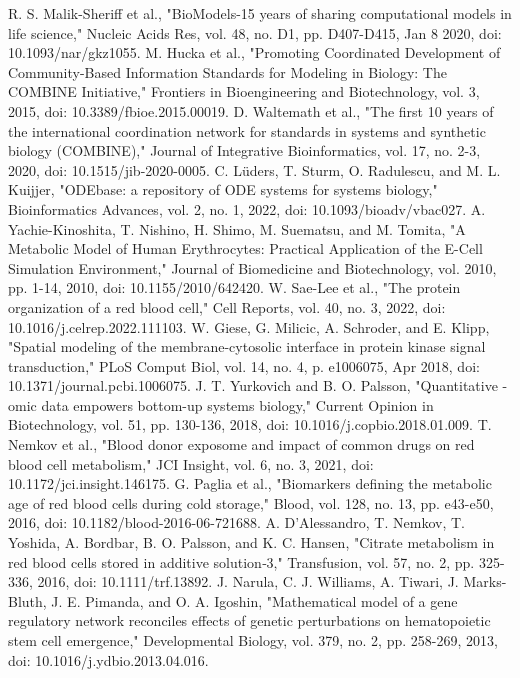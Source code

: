 \documentclass[conference]{IEEEtran}
\begin{document}
\begin{thebibliography}{00}
 R. S. Malik-Sheriff et al., "BioModels-15 years of sharing computational models in life science," Nucleic Acids Res, vol. 48, no. D1, pp. D407-D415, Jan 8 2020, doi: 10.1093/nar/gkz1055.
 M. Hucka et al., "Promoting Coordinated Development of Community-Based Information Standards for Modeling in Biology: The COMBINE Initiative," Frontiers in Bioengineering and Biotechnology, vol. 3, 2015, doi: 10.3389/fbioe.2015.00019.
 D. Waltemath et al., "The first 10 years of the international coordination network for standards in systems and synthetic biology (COMBINE)," Journal of Integrative Bioinformatics, vol. 17, no. 2-3, 2020, doi: 10.1515/jib-2020-0005.
 C. Lüders, T. Sturm, O. Radulescu, and M. L. Kuijjer, "ODEbase: a repository of ODE systems for systems biology," Bioinformatics Advances, vol. 2, no. 1, 2022, doi: 10.1093/bioadv/vbac027.
 A. Yachie-Kinoshita, T. Nishino, H. Shimo, M. Suematsu, and M. Tomita, "A Metabolic Model of Human Erythrocytes: Practical Application of the E-Cell Simulation Environment," Journal of Biomedicine and Biotechnology, vol. 2010, pp. 1-14, 2010, doi: 10.1155/2010/642420.
 W. Sae-Lee et al., "The protein organization of a red blood cell," Cell Reports, vol. 40, no. 3, 2022, doi: 10.1016/j.celrep.2022.111103.
 W. Giese, G. Milicic, A. Schroder, and E. Klipp, "Spatial modeling of the membrane-cytosolic interface in protein kinase signal transduction," PLoS Comput Biol, vol. 14, no. 4, p. e1006075, Apr 2018, doi: 10.1371/journal.pcbi.1006075.
 J. T. Yurkovich and B. O. Palsson, "Quantitative -omic data empowers bottom-up systems biology," Current Opinion in Biotechnology, vol. 51, pp. 130-136, 2018, doi: 10.1016/j.copbio.2018.01.009.
 T. Nemkov et al., "Blood donor exposome and impact of common drugs on red blood cell metabolism," JCI Insight, vol. 6, no. 3, 2021, doi: 10.1172/jci.insight.146175.
 G. Paglia et al., "Biomarkers defining the metabolic age of red blood cells during cold storage," Blood, vol. 128, no. 13, pp. e43-e50, 2016, doi: 10.1182/blood-2016-06-721688.
 A. D'Alessandro, T. Nemkov, T. Yoshida, A. Bordbar, B. O. Palsson, and K. C. Hansen, "Citrate metabolism in red blood cells stored in additive solution‐3," Transfusion, vol. 57, no. 2, pp. 325-336, 2016, doi: 10.1111/trf.13892.
 J. Narula, C. J. Williams, A. Tiwari, J. Marks-Bluth, J. E. Pimanda, and O. A. Igoshin, "Mathematical model of a gene regulatory network reconciles effects of genetic perturbations on hematopoietic stem cell emergence," Developmental Biology, vol. 379, no. 2, pp. 258-269, 2013, doi: 10.1016/j.ydbio.2013.04.016.

\end{thebibliography}
\end{document}
